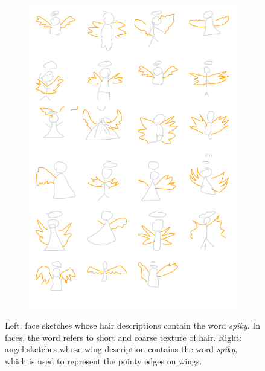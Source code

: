 \begin{figure}[!htb]
\begin{subfigure}{.5\textwidth}
\includegraphics[width=\linewidth]{data_collection/summary/spikyangel.png}  
\end{subfigure}
\caption{Left: face sketches whose hair descriptions contain the word \textit{spiky}. In faces, the word refers to short and coarse texture of hair. Right: angel sketches whose wing description contains the word \textit{spiky}, which is used to represent the pointy edges on wings.}
\label{datasummary.spiky}
\end{figure}